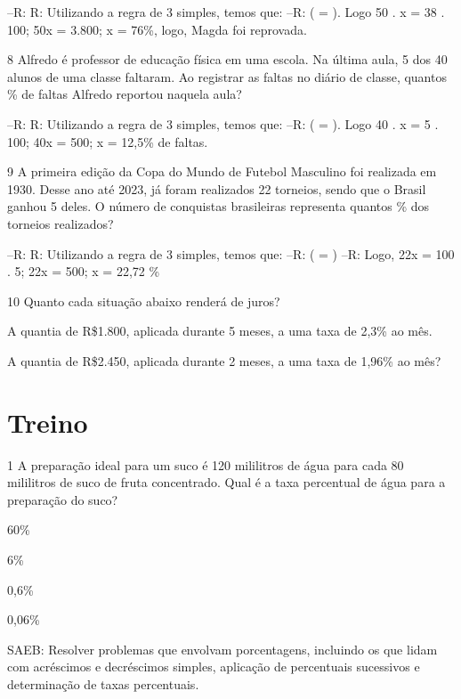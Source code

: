 {--R: R: Utilizando a regra de 3 simples, temos que:
--R: ( = ). Logo 50 . x = 38 . 100; 50x = 3.800; x = 76\%, logo, Magda foi reprovada.

\num{8} Alfredo é professor de educação física em uma escola. Na última aula,
5 dos 40 alunos de uma classe faltaram. Ao registrar as faltas no diário
de classe, quantos \% de faltas Alfredo reportou naquela aula?

--R: R: Utilizando a regra de 3 simples, temos que:
--R: ( = ). Logo 40 . x = 5 . 100; 40x = 500; x = 12,5\% de faltas.

\num{9} A primeira edição da Copa do Mundo de Futebol Masculino foi realizada
em 1930. Desse ano até 2023, já foram realizados 22 torneios, sendo que
o Brasil ganhou 5 deles. O número de conquistas brasileiras representa
quantos \% dos torneios realizados?

--R: R: Utilizando a regra de 3 simples, temos que:
--R: ( = )
--R: Logo, 22x = 100 . 5; 22x = 500; x = 22,72 \%

\num{10} Quanto cada situação abaixo renderá de juros?

\item A quantia de R\$1.800, aplicada durante 5 meses, a uma taxa de 2,3\%
ao mês.


\item A quantia de R\$2.450, aplicada durante 2 meses, a uma taxa de 1,96\% ao mês?


\section{Treino}

\num{1} A preparação ideal para um suco é 120 mililitros de água para cada 80
mililitros de suco de fruta concentrado. Qual é a taxa percentual de
água para a preparação do suco?
\item 60\%
\item 6\%
\item 0,6\%
\item 0,06\%

SAEB: Resolver problemas que envolvam porcentagens, incluindo os que
lidam com acréscimos e decréscimos simples, aplicação de percentuais
sucessivos e determinação de taxas percentuais.

}
